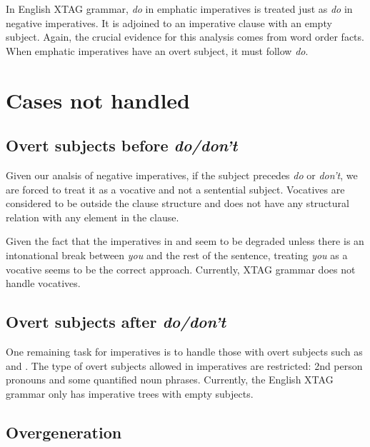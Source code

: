 In English XTAG grammar, {\it do} in emphatic imperatives is treated just
as {\it do} in negative imperatives.  It is adjoined to an imperative
clause with an empty subject.  Again, the crucial evidence for this
analysis comes from word order facts.  When emphatic imperatives have an
overt subject, it must follow {\it do}.


\section{Cases not handled}

\subsection{Overt subjects before {\it do/don't}}
\label{sec:vocative}

Given our analsis of negative imperatives, if the subject precedes {\it do}
or {\it don't}, we are forced to treat it as a vocative and not a
sentential subject.  Vocatives are considered to be outside the clause
structure and does not have any structural relation with any element in the
clause.


Given the fact that the imperatives in  and  seem to be
degraded unless there is an intonational break between {\it you} and the
rest of the sentence, treating {\it you} as a vocative seems to be the
correct approach.  Currently, XTAG grammar does not handle vocatives.

\subsection{Overt subjects after {\it do/don't}}
\label{sec:overt-subject}

One remaining task for imperatives is to handle those with overt subjects
such as  and .
The type of overt subjects allowed in imperatives are restricted: 2nd
person pronouns and some quantified noun phrases. Currently, the English
XTAG grammar only has imperative trees with empty subjects.  

\subsection{Overgeneration}

